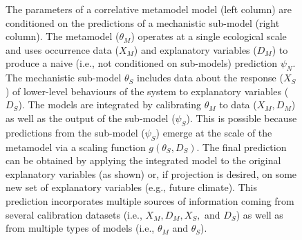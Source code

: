 \begin{figure}

\caption{The parameters of a correlative metamodel model (left column) are conditioned on the predictions of a mechanistic sub-model (right column).
The metamodel ($\theta_M$) operates at a single ecological scale and uses occurrence data (\(X_M\)) and explanatory variables ($D_M$) to produce a naive (i.e., not conditioned on sub-models) prediction $\psi_N$.
The mechanistic sub-model \(\theta_S\) includes data about the response (\(X_S\)) of lower-level behaviours of the system to explanatory variables ($D_S$). 
The models are integrated by calibrating $\theta_M$ to data ($X_M, D_M$) as well as the output of the sub-model ($\psi_S$). 
This is possible because predictions from the sub-model ($\psi_S$) emerge at the scale of the metamodel via a scaling function \(g(\theta_S, D_S)\).
The final prediction can be obtained by applying the integrated model to the original explanatory variables (as shown) or, if projection is desired, on some new set of explanatory variables (e.g., future climate).
This prediction incorporates multiple sources of information coming from several calibration datasets (i.e., $X_M, D_M, X_S, $ and $D_S$) as well as from multiple types of models (i.e., $\theta_M$ and $\theta_S$).
}
\label{fig:diagram}
\end{figure}
